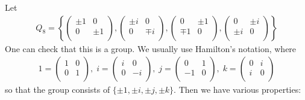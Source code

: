 \documentclass{../template/note}
\begin{document}
    \begin{example}
        Let
        \begin{align*}
            Q_8 = \left\{\begin{pmatrix}
             \pm 1 & 0 \\
             0 & \pm 1 \\
            \end{pmatrix}, \begin{pmatrix}
             \pm i & 0 \\
             0 & \mp i \\
            \end{pmatrix}, \begin{pmatrix}
             0 & \pm 1 \\
             \mp 1 & 0 \\
            \end{pmatrix}, \begin{pmatrix}
             0 & \pm i \\
             \pm i & 0 \\
            \end{pmatrix}\right\}
        \end{align*}
        One can check that this is a group. We usually use Hamilton's notation, where
        \begin{align*}
            1 = \begin{pmatrix}
             1 & 0 \\
             0 & 1 \\
            \end{pmatrix},\;
            i = \begin{pmatrix}
             i & 0 \\
             0 & -i \\
            \end{pmatrix},\;
            j = \begin{pmatrix}
             0 & 1 \\
             -1 & 0 \\
            \end{pmatrix},\;
            k = \begin{pmatrix}
             0 & i \\
             i & 0 \\
            \end{pmatrix}
        \end{align*}
        so that the group consists of \(\{\pm 1, \pm i, \pm j, \pm k\}\). Then we have various properties:

\end{example}
\end{document}
